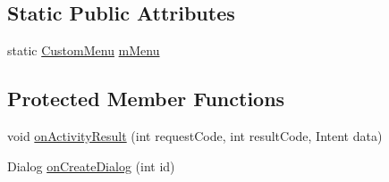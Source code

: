 \subsection*{Static Public Attributes}
\begin{DoxyCompactItemize}
\item 
static \hyperlink{classcom_1_1zia_1_1freshdocs_1_1widget_1_1fileexplorer_1_1custommenu_1_1_custom_menu}{Custom\-Menu} \hyperlink{classcom_1_1zia_1_1freshdocs_1_1activity_1_1_file_explorer_activity_a8c05ad419f1bd9f65cd5a4adc591be23}{m\-Menu}
\end{DoxyCompactItemize}
\subsection*{Protected Member Functions}
\begin{DoxyCompactItemize}
\item 
void \hyperlink{classcom_1_1zia_1_1freshdocs_1_1activity_1_1_file_explorer_activity_a936101f26f4953dc422700829567aa96}{on\-Activity\-Result} (int request\-Code, int result\-Code, Intent data)
\item 
Dialog \hyperlink{classcom_1_1zia_1_1freshdocs_1_1activity_1_1_file_explorer_activity_af37203200cdea5af74aadf57cdbfc77e}{on\-Create\-Dialog} (int id)
\end{DoxyCompactItemize}


